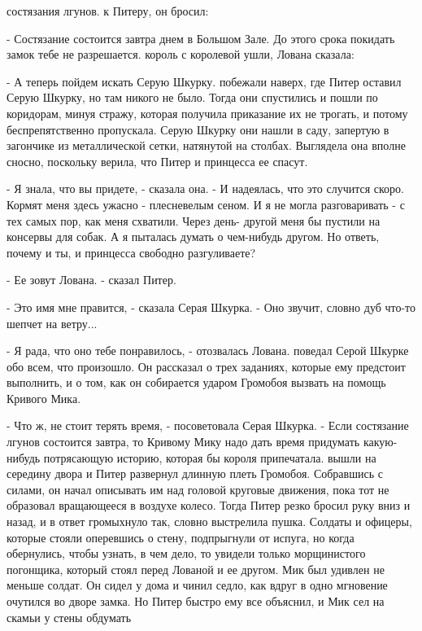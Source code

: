 состязания лгунов.
 к Питеру, он бросил:
\par- Состязание состоится завтра днем в Большом Зале. До этого срока 
покидать замок тебе не разрешается.
 король с королевой ушли, Лована сказала:
\par- А теперь пойдем искать Серую Шкурку.
 побежали наверх, где Питер оставил Серую Шкурку, но там никого 
не было. Тогда они спустились и пошли по коридорам, минуя стражу, 
которая получила приказание их не трогать, и потому беспрепятственно 
пропускала. Серую Шкурку они нашли в саду, запертую в загончике из 
металлической сетки, натянутой на столбах. Выглядела она вполне 
сносно, поскольку верила, что Питер и принцесса ее спасут.
\par- Я знала, что вы придете, - сказала она. - И надеялась, что это 
случится скоро. Кормят меня здесь ужасно - плесневелым сеном. И я не 
могла разговаривать - с тех самых пор, как меня схватили. Через день-
другой меня бы пустили на консервы для собак. А я пыталась думать о 
чем-нибудь другом. Но ответь, почему и ты, и принцесса свободно 
разгуливаете?
\par- Ее зовут Лована. - сказал Питер.
\par- Это имя мне правится, - сказала Серая Шкурка. - Оно звучит, 
словно дуб что-то шепчет на ветру...
\par- Я рада, что оно тебе понравилось, - отозвалась Лована.
 поведал Серой Шкурке обо всем, что произошло. Он рассказал о 
трех заданиях, которые ему предстоит выполнить, и о том, как он 
собирается ударом Громобоя вызвать на помощь Кривого Мика.
\par- Что ж, не стоит терять время, - посоветовала Серая Шкурка. - 
Если состязание лгунов состоится завтра, то Кривому Мику надо дать 
время придумать какую-нибудь потрясающую историю, которая бы короля 
припечатала.
 вышли на середину двора и Питер развернул длинную плеть 
Громобоя. Собравшись с силами, он начал описывать им над головой 
круговые движения, пока тот не образовал вращающееся в воздухе колесо. 
Тогда Питер резко бросил руку вниз и назад, и в ответ громыхнуло так, 
словно выстрелила пушка. Солдаты и офицеры, которые стояли оперевшись 
о стену, подпрыгнули от испуга, но когда обернулись, чтобы узнать, в 
чем дело, то увидели только морщинистого погонщика, который стоял 
перед Лованой и ее другом.
 Мик был удивлен не меньше солдат. Он сидел у дома и чинил 
седло, как вдруг в одно мгновение очутился во дворе замка. Но Питер 
быстро ему все объяснил, и Мик сел на скамьи у стены обдумать 
